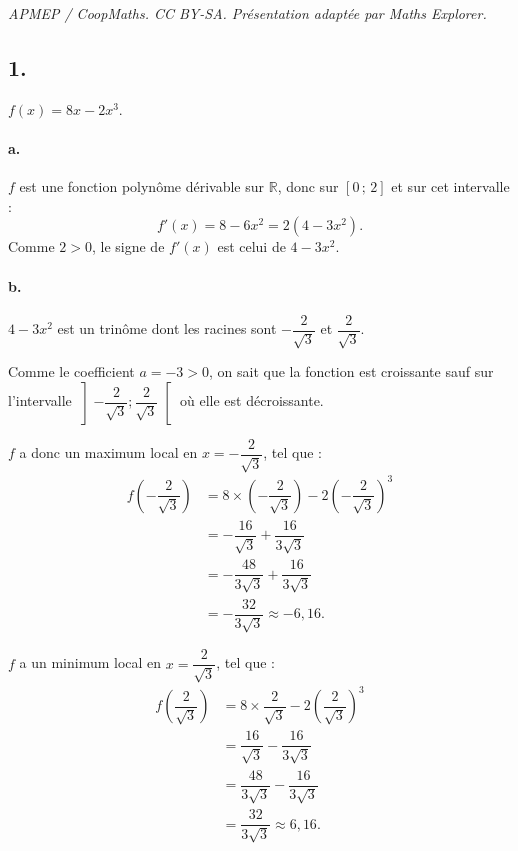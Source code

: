 \documentclass[10pt]{article}
\begin{document}
\noindent\textit{APMEP / CoopMaths. CC BY-SA. Présentation adaptée par Maths Explorer.}\par\medskip
\subsection*{1.}

\(f(x) = 8x - 2x^3\).

\paragraph{a.} \( f \) est une fonction polynôme dérivable sur \( \mathbb{R} \), donc sur \([0\,;\,2]\) et sur cet intervalle :
\[
f'(x) = 8 - 6x^2 = 2(4 - 3x^2).
\]
Comme \( 2 > 0 \), le signe de \( f'(x) \) est celui de \( 4 - 3x^2 \).

\paragraph{b.} \( 4 - 3x^2 \) est un trinôme dont les racines sont \( -\dfrac{2}{\sqrt{3}} \) et \( \dfrac{2}{\sqrt{3}} \).

Comme le coefficient \( a = -3 > 0 \), on sait que la fonction est croissante sauf sur l'intervalle \( \left] -\dfrac{2}{\sqrt{3}} ; \dfrac{2}{\sqrt{3}} \right[ \) où elle est décroissante.

\( f \) a donc un maximum local en \( x = -\dfrac{2}{\sqrt{3}} \), tel que :
\begin{align*}
f\left( -\dfrac{2}{\sqrt{3}} \right) &= 8 \times \left( -\dfrac{2}{\sqrt{3}} \right) - 2\left( -\dfrac{2}{\sqrt{3}} \right)^3 \\
&= -\dfrac{16}{\sqrt{3}} + \dfrac{16}{3\sqrt{3}} \\
&= -\dfrac{48}{3\sqrt{3}} + \dfrac{16}{3\sqrt{3}} \\
&= -\dfrac{32}{3\sqrt{3}} \approx -6{,}16.
\end{align*}

\( f \) a un minimum local en \( x = \dfrac{2}{\sqrt{3}} \), tel que :
\begin{align*}
f\left( \dfrac{2}{\sqrt{3}} \right) &= 8 \times \dfrac{2}{\sqrt{3}} - 2\left( \dfrac{2}{\sqrt{3}} \right)^3 \\
&= \dfrac{16}{\sqrt{3}} - \dfrac{16}{3\sqrt{3}} \\
&= \dfrac{48}{3\sqrt{3}} - \dfrac{16}{3\sqrt{3}} \\
&= \dfrac{32}{3\sqrt{3}} \approx 6{,}16.
\end{align*}
\end{document}
